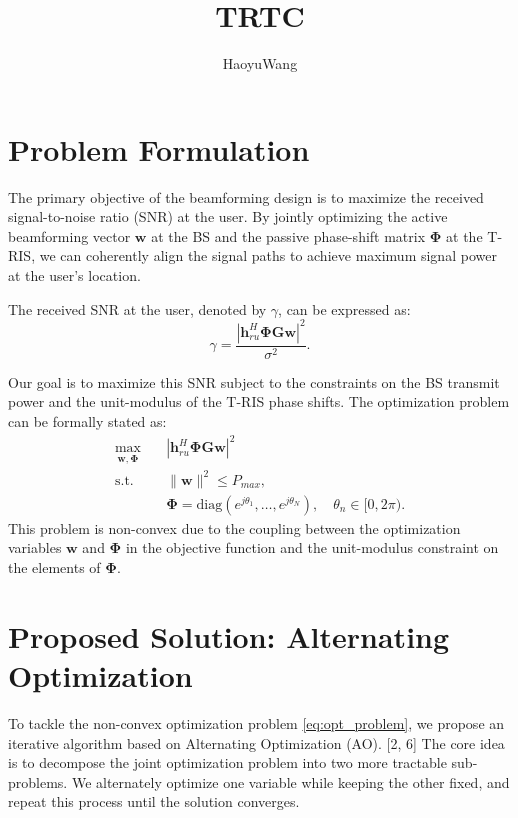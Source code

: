 \documentclass[journal,comsoc]{IEEEtran}
\title{TRTC}
\author{HaoyuWang}
\begin{document}
\section{Problem Formulation}

The primary objective of the beamforming design is to maximize the received signal-to-noise ratio (SNR) at the user. By jointly optimizing the active beamforming vector $\mathbf{w}$ at the BS and the passive phase-shift matrix $\boldsymbol{\Phi}$ at the T-RIS, we can coherently align the signal paths to achieve maximum signal power at the user's location.

The received SNR at the user, denoted by $\gamma$, can be expressed as:
\begin{equation}
	\gamma = \frac{|\mathbf{h}_{ru}^H \boldsymbol{\Phi} \mathbf{G} \mathbf{w}|^2}{\sigma^2}.
\end{equation}

Our goal is to maximize this SNR subject to the constraints on the BS transmit power and the unit-modulus of the T-RIS phase shifts. The optimization problem can be formally stated as:
\begin{align}
	\max_{\mathbf{w}, \boldsymbol{\Phi}} \quad & |\mathbf{h}_{ru}^H \boldsymbol{\Phi} \mathbf{G} \mathbf{w}|^2 \label{eq:opt_problem} \\
	\mathrm{s.t.} \quad & \|\mathbf{w}\|^2 \le P_{max}, \label{eq:power_constraint} \\
	& \boldsymbol{\Phi} = \mathrm{diag}(e^{j\theta_1}, \dots, e^{j\theta_N}), \quad \theta_n \in [0, 2\pi). \label{eq:ris_constraint}
\end{align}
This problem is non-convex due to the coupling between the optimization variables $\mathbf{w}$ and $\boldsymbol{\Phi}$ in the objective function and the unit-modulus constraint on the elements of $\boldsymbol{\Phi}$.

\section{Proposed Solution: Alternating Optimization}

To tackle the non-convex optimization problem \eqref{eq:opt_problem}, we propose an iterative algorithm based on Alternating Optimization (AO). [2, 6] The core idea is to decompose the joint optimization problem into two more tractable sub-problems. We alternately optimize one variable while keeping the other fixed, and repeat this process until the solution converges.
\end{document}
